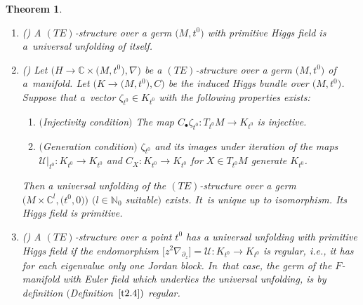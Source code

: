 \documentclass[pdftex]{sigma}%
\numberwithin{equation}{section}
\numberwithin{figure}{section}
\newcommand{\N}{{\mathbb N}}
\newcommand{\C}{{\mathbb C}}
\newcommand{\UU}{{\mathcal U}}
\newcommand{\paa}{\partial}
\newcommand{\nnn}{\nabla}
\newtheorem{Theorem}{Theorem}[section]
\begin{document}
\begin{Theorem}\label{t3.16}\qquad

\begin{enumerate}\itemsep=0pt
\item[$(a)$] {\rm (\cite[Theorem~2.5]{HM04})}
A $(TE)$-structure over a germ $\big(M,t^0\big)$ with
primitive Higgs field is a~universal unfolding of itself.

\item[$(b)$] {\rm (\cite[Theorem~2.5]{HM04})}
Let $\big(H\to\C\times\big(M,t^0\big),\nnn\big)$ be a $(TE)$-structure over
a germ $\big(M,t^0\big)$ of a~manifold.
Let $\big(K\to \big(M,t^0\big),C\big)$ be the induced Higgs bundle over
$\big(M,t^0\big)$. Suppose that a~vec\-tor $\zeta_{t^0}\in K_{t^0}$
with the following properties exists:
\begin{enumerate}\itemsep=0pt\setlength{\leftskip}{0.25cm}
\item[$(IC)$] $($Injectivity condition$)$ The map
$C_\bullet \zeta_{t^0}\colon T_{t^0}M\to K_{t^0}$ is injective.
\item[$(GC)$] $($Generation condition$)$ $\zeta_{t^0}$ and
its images under iteration of the maps
$\UU|_{t^0}\colon K_{t^0}\to K_{t^0}$ and $C_X\colon K_{t^0}\to K_{t^0}$
for $X\in T_{t^0}M$ generate $K_{t^0}$.
\end{enumerate}
Then a universal unfolding of the $(TE)$-structure over
a germ $\big(M\times \C^l,\big(t^0,0\big)\big)$ $(l\in\N_0$ suitable$)$
exists. It~is unique up to isomorphism.
Its Higgs field is primitive.

\item[$(c)$] {\rm (\cite{Ma86})} A $(TE)$-structure over a point $t^0$ has
a universal unfolding with primitive Higgs field
if the endomorphism
$\big[z^2\nnn_{\paa_z}\big]=\UU\colon K_{t^0}\to K_{t^0}$
is regular, i.e., it has for each eigenvalue only one
Jordan block. In~that case, the germ of the $F$-manifold with Euler field
which underlies the universal unfolding,
is by definition $($Definition~$\ref{t2.4})$ regular.
\end{enumerate}
\end{Theorem}
\end{document}
